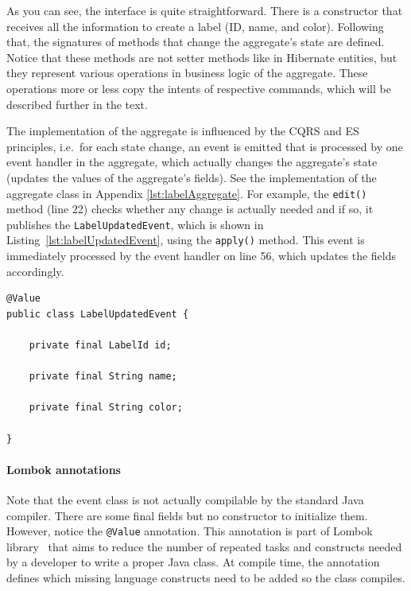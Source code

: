 \documentclass{book}
\begin{document}
As you can see, the interface is quite straightforward. There is a
constructor that receives all the information to create a label (ID,
name, and color). Following that, the signatures of methods that change
the aggregate's state are defined. Notice that these methods are not
setter methods like in Hibernate entities, but they represent various
operations in business logic of the aggregate. These operations more or
less copy the intents of respective commands, which will be described
further in the text.

The implementation of the aggregate is influenced by the CQRS and ES
principles, i.e.~for each state change, an event is emitted that is
processed by one event handler in the aggregate, which actually
changes the aggregate's state (updates the values of the aggregate's
fields). See the implementation of the aggregate class in Appendix \ref{lst:labelAggregate}.
For example, the \texttt{edit()} method (line 22) checks whether any change is actually needed and if so, it publishes
the \texttt{LabelUpdatedEvent}, which is shown in Listing~\ref{lst:labelUpdatedEvent}, using the \texttt{apply()} method.
This event is immediately processed by the event handler on line 56, which updates the fields accordingly.

\begin{lstlisting}[caption={The \texttt{LabelUpdatedEvent} class},label={lst:labelUpdatedEvent},captionpos=b,float,floatplacement=H]
@Value
public class LabelUpdatedEvent {

    private final LabelId id;

    private final String name;

    private final String color;

}
\end{lstlisting}

\paragraph{Lombok annotations}

Note that the event class is not actually compilable by the standard Java
compiler. There are some final fields but no constructor to initialize
them. However, notice the \texttt{@Value} annotation. This annotation is part
of Lombok library~\cite{lombok} that aims to reduce the number of
repeated tasks and constructs needed by a developer to write a proper
Java class. At compile time, the annotation defines which missing
language constructs need to be added so the class compiles.
\end{document}
